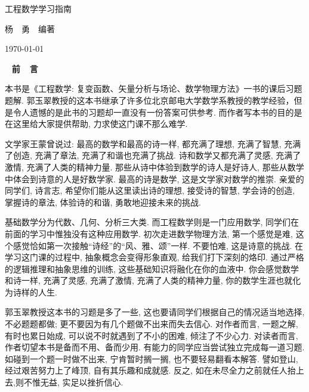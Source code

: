 \documentclass[10pt,UTF8]{ctexbook}
\newcommand{\hei}{\heiti}
\theoremstyle{plain}
\numberwithin{equation}{chapter}
\numberwithin{algorithm}{chapter}
\begin{document}
\frontmatter
\begin{titlepage}\Large
\renewcommand{\thefootnote}{\fnsymbol{footnote}}
  \begin{center}
  \vspace*{3cm}
  {\hei\Huge 工程数学学习指南} \bigskip

  {\hei\LARGE 杨~~勇~~编著} \medskip

  \today

  \end{center}
\end{titlepage}




\clearpage{\pagestyle{empty}}
\vspace*{0.04\textheight}
\begin{center}\Large\
	\textbf{
		前~~言\bigskip
	}
\end{center}


本书是《工程数学: 复变函数、矢量分析与场论、数学物理方法》一书的课后习题题解. 郭玉翠教授的这本书继承了许多位北京邮电大学数学系教授的教学经验，但是令人遗憾的是此书的习题却一直没有一份答案可供参考. 而作者写本书的目的是在这里给大家提供帮助, 力求使这门课不那么难学.

文学家王蒙曾说过: 最高的数学和最高的诗一样, 都充满了理想, 充满了智慧, 充满了创造, 充满了章法, 充满了和谐也充满了挑战. 诗和数学又都充满了灵感, 充满了激情, 充满了人类的精神力量. 那些从诗中体验到数学的诗人是好诗人, 那些从数学中体会到诗意的人是好数学家. 最高的诗是数学, 这是文学家对数学的推崇. 亲爱的同学们, 诗言志, 希望你们能从这里读出诗的理想, 接受诗的智慧, 学会诗的创造, 掌握诗的章法, 体验诗的和谐, 勇敢地迎接未来的挑战.

基础数学分为代数、几何、分析三大类. 而工程数学则是一门应用数学, 同学们在前面的学习中惟独没有这种应用数学. 初次走进数学物理方法, 第一个感觉是难, 这个感觉恰如第一次接触“诗经”的“风、雅、颂”一样. 不要怕难, 这是诗意的挑战. 在学习这门课的过程中, 抽象概念会变得形象直观, 给我们打下深刻的烙印. 通过严格的逻辑推理和抽象思维的训练, 这些基础知识将融化在你的血液中. 你会感觉数学和诗一样, 充满了灵感, 充满了激情, 充满了人类的精神力量, 你的数学生涯也就化为诗样的人生.

郭玉翠教授这本书的习题是多了一些, 这也要请同学们根据自己的情况适当地选择, 不必题题都做; 更不要因为有几个题做不出来而失去信心. 对作者而言, 一题之解, 有时也累日始成, 可以说不时就遇到了不小的困难, 倾注了不少心力. 对读者而言, 作者切望本书是备而不用、备而少用. 有能力的同学应当尝试独立完成每一道习题. 如碰到一个题一时做不出来, 宁肯暂时搁一搁, 也不要轻易翻看本解答. 譬如登山, 经过艰苦努力上了峰顶, 自有其乐趣和成就感. 反之, 如在未尽全力之前就任人抬上去,则不惟无益, 实足以挫折信心.
\end{document}
